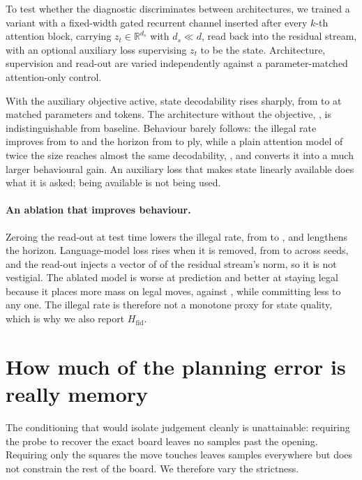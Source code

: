 \documentclass[10pt]{article}
\begin{document}
To test whether the diagnostic discriminates between architectures, we trained a
variant with a fixed-width gated recurrent channel inserted after every $k$-th
attention block, carrying $z_t \in \mathbb{R}^{d_s}$ with $d_s \ll d$, read back
into the residual stream, with an optional auxiliary loss supervising $z_t$ to be
the state. Architecture, supervision and read-out are varied independently
against a parameter-matched attention-only control.



With the auxiliary objective active, state decodability rises sharply, from
 to  at matched parameters and tokens. The
architecture without the objective, , is indistinguishable
from baseline. Behaviour barely follows: the illegal rate improves from
 to  and the horizon from
 to  ply, while a plain attention model of
twice the size reaches almost the same decodability, , and
converts it into a much larger behavioural gain. An auxiliary loss that makes
state linearly available does what it is asked; being available is not being
used.

\paragraph{An ablation that improves behaviour.} Zeroing the read-out at test
time lowers the illegal rate, from  to ,
and lengthens the horizon. Language-model loss rises when it is removed, from
 to  across seeds, and the read-out injects a
vector of  of the residual stream's norm, so it is not
vestigial. The ablated model is worse at prediction and better at staying legal
because it places more mass on legal moves,  against
, while committing less to any one. The illegal rate is
therefore not a monotone proxy for state quality, which is why we also report
$H_{\mathrm{fid}}$.

\section{How much of the planning error is really memory}
\label{app:plan}

The conditioning that would isolate judgement cleanly is unattainable: requiring
the probe to recover the exact board leaves no samples past the opening.
Requiring only the squares the move touches leaves samples everywhere but does
not constrain the rest of the board. We therefore vary the strictness.
\end{document}
